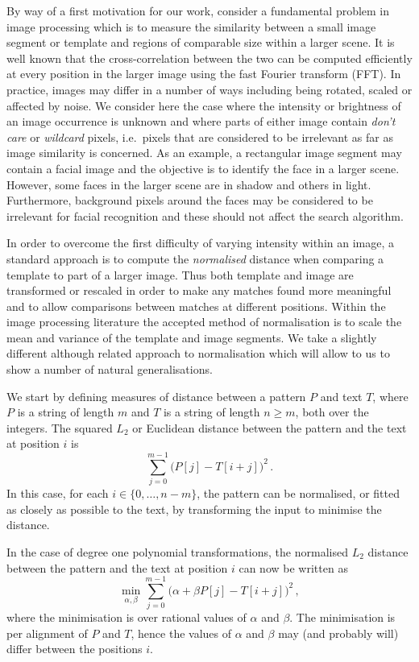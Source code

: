 \documentclass[11pt]{article}
\renewcommand{\geq}{\geqslant}
\theoremstyle{plain}
\theoremstyle{definition}
\begin{document}
By way of a first motivation for our work, consider a fundamental problem in image processing which is to measure the similarity between a small image segment or template and regions of comparable size within a larger scene. It is well known that the cross-correlation between the
two can be computed efficiently at every position in the larger image
using the fast Fourier transform (FFT).  In practice, images may
differ in a number of ways including being rotated, scaled or affected
by noise.  We consider here the case where the intensity or brightness
of an image occurrence is unknown and where parts of either image
contain \emph{don't care} or \emph{wildcard} pixels, i.e.\ pixels
that are considered to be irrelevant as far as image similarity is
concerned.  As an example, a rectangular image segment may contain a
facial image and the objective is to identify the face in a larger
scene. However, some faces in the larger scene are in shadow and
others in light.  Furthermore, background pixels around the faces may
be considered to be irrelevant for facial recognition and these should
not affect the search algorithm.

In order to overcome the first difficulty of varying intensity within
an image, a standard approach is to compute the \emph{normalised}
distance when comparing a template to part of a larger image.  Thus both template and image are transformed or rescaled
in order to make any matches found more meaningful and to allow comparisons between matches at different positions. Within the image processing literature the accepted method of normalisation is to scale the mean and variance of the template and image segments. We take a slightly different although related approach to normalisation which will allow to us to show a number of natural generalisations.



We start by defining measures of distance between a pattern $P$ and text $T$, where $P$ is a string of length $m$ and $T$ is a string of length $n\geq m$, both over the integers.
The squared $L_2$ or Euclidean distance between the pattern and the text at position $i$ is
\begin{equation*}
    \sum_{j=0}^{m-1} \big(P[j] - T[i+j]\big)^2 \,.
\end{equation*}
In this case, for each $i\in\{0,\ldots,n-m\}$, the pattern can be normalised, or fitted as closely as possible to the text, by transforming the input to minimise the distance.


In the case of degree one polynomial transformations, the normalised $L_2$ distance between the pattern and the text at position $i$ can now be written as
\begin{equation*}
    \min_{\alpha, \beta} \sum_{j=0}^{m-1} \big(\alpha + \beta P[j] - T[i+j]\big)^2 \,,
\end{equation*}
where the minimisation is over rational values of $\alpha$ and $\beta$. The minimisation is per alignment of $P$ and $T$, hence the values of $\alpha$ and $\beta$ may (and probably will) differ between the positions $i$.
\end{document}

